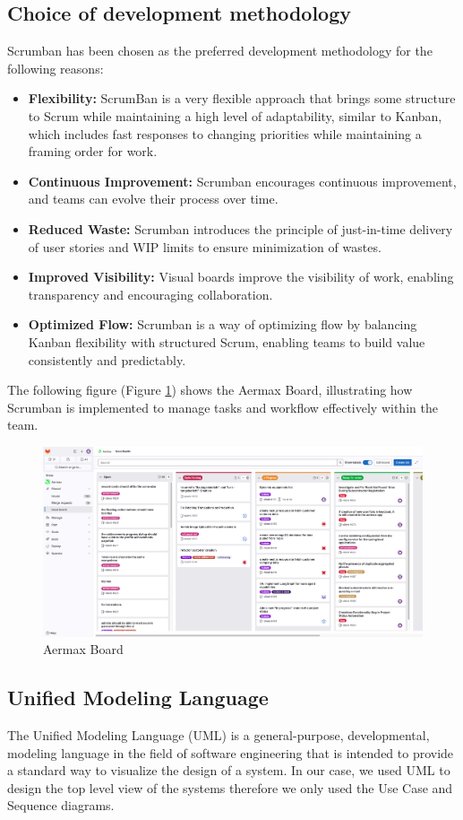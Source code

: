 \subsection{Choice of development methodology}
Scrumban has been chosen as the preferred development methodology for the following reasons:
\begin{itemize}
    \item \textbf{Flexibility:} ScrumBan is a very flexible approach that brings some structure to Scrum while maintaining a high level of adaptability, similar to Kanban, which includes fast responses to changing priorities while maintaining a framing order for work.
    \item \textbf{Continuous Improvement:} Scrumban encourages continuous improvement, and teams can evolve their process over time.
    \item \textbf{Reduced Waste:} Scrumban introduces the principle of just-in-time delivery of user stories and WIP limits to ensure minimization of wastes.
    \item \textbf{Improved Visibility:} Visual boards improve the visibility of work, enabling transparency and encouraging collaboration.
    \item \textbf{Optimized Flow:} Scrumban is a way of optimizing flow by balancing Kanban flexibility with structured Scrum, enabling teams to build value consistently and predictably.
\end{itemize}
The following figure (Figure \ref{fig:armax-board}) shows the Aermax Board, illustrating how Scrumban is implemented to manage tasks and workflow effectively within the team.
\begin{figure}[H]
    \centering
    \includegraphics[width=1\textwidth]{src/assets/chapters/aermax-board.png}
    \caption{Aermax Board}
    \label{fig:armax-board}
\end{figure}
\subsection{Unified Modeling Language}
The Unified Modeling Language (UML) is a general-purpose, developmental, modeling language in the field of software engineering that is intended to provide a standard way to visualize the design of a system. In our case, we used UML to design the top level view of the systems therefore we only used the Use Case and Sequence diagrams.

